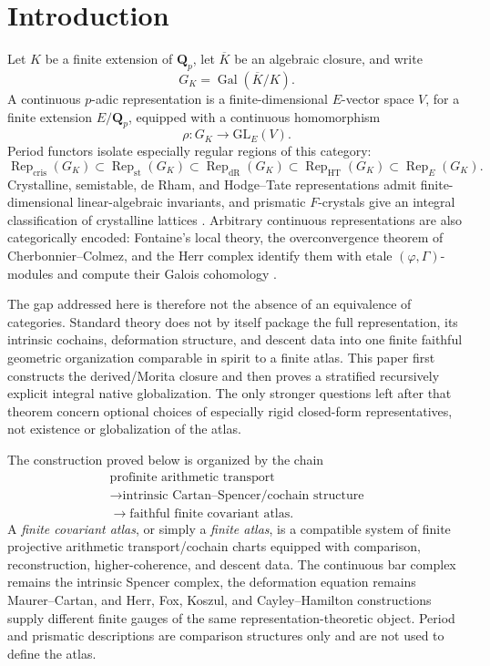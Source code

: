 \documentclass[11pt]{article}
\theoremstyle{definition}
\newcommand{\Qp}{\mathbf Q_p}
\newcommand{\GK}{G_K}
\newcommand{\Rep}{\operatorname{Rep}}
\newcommand{\Gal}{\operatorname{Gal}}
\newcommand{\cris}{\mathrm{cris}}
\newcommand{\st}{\mathrm{st}}
\newcommand{\dR}{\mathrm{dR}}
\begin{document}
\tableofcontents

\section{Introduction}

Let $K$ be a finite extension of $\Qp$, let $\overline K$ be an algebraic closure, and write
\[
\GK=\Gal(\overline K/K).
\]
A continuous $p$-adic representation is a finite-dimensional $E$-vector space $V$, for a finite extension $E/\Qp$, equipped with a continuous homomorphism
\[
\rho:\GK\longrightarrow \mathrm{GL}_E(V).
\]
Period functors isolate especially regular regions of this category:
\[
\Rep_{\cris}(\GK)\subset \Rep_{\st}(\GK)\subset \Rep_{\dR}(\GK)
\subset \Rep_{\mathrm{HT}}(\GK)\subset \Rep_E(\GK).
\]
Crystalline, semistable, de Rham, and Hodge--Tate representations admit finite-dimensional linear-algebraic invariants, and prismatic $F$-crystals give an integral classification of crystalline lattices \cite{BhattScholzePFC}.  Arbitrary continuous representations are also categorically encoded: Fontaine's local theory, the overconvergence theorem of Cherbonnier--Colmez, and the Herr complex identify them with etale $(\varphi,\Gamma)$-modules and compute their Galois cohomology \cite{FontaineLocal,CherbonnierColmez,HerrSurvey,LiuCohomology,BergerTrianguline,ColmezTrianguline}.

The gap addressed here is therefore not the absence of an equivalence of categories.  Standard theory does not by itself package the full representation, its intrinsic cochains, deformation structure, and descent data into one finite faithful geometric organization comparable in spirit to a finite atlas.  This paper first constructs the derived/Morita closure and then proves a stratified recursively explicit integral native globalization.  The only stronger questions left after that theorem concern optional choices of especially rigid closed-form representatives, not existence or globalization of the atlas.

The construction proved below is organized by the chain
\[
\boxed{
\begin{gathered}
\text{profinite arithmetic transport}\\
\longrightarrow \text{intrinsic Cartan--Spencer/cochain structure}\\
\longrightarrow \text{faithful finite covariant atlas}.
\end{gathered}}
\]
A \emph{finite covariant atlas}, or simply a \emph{finite atlas}, is a compatible system of finite projective arithmetic transport/cochain charts equipped with comparison, reconstruction, higher-coherence, and descent data.  The continuous bar complex remains the intrinsic Spencer complex, the deformation equation remains Maurer--Cartan, and Herr, Fox, Koszul, and Cayley--Hamilton constructions supply different finite gauges of the same representation-theoretic object.  Period and prismatic descriptions are comparison structures only and are not used to define the atlas.
\end{document}
